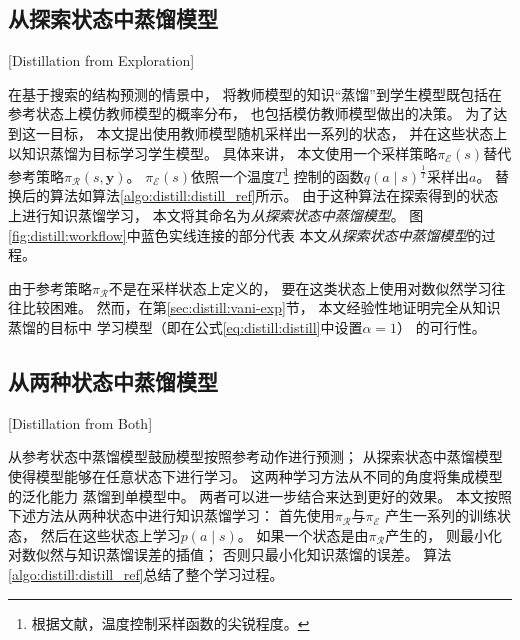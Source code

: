 
\subsection{从探索状态中蒸馏模型}[Distillation from Exploration]\label{sec:distill:distill_explore}

在基于搜索的结构预测的情景中，
将教师模型的知识``蒸馏''到学生模型既包括在参考状态上模仿教师模型的概率分布，
也包括模仿教师模型做出的决策。
为了达到这一目标，
本文提出使用教师模型随机采样出一系列的状态，
并在这些状态上以知识蒸馏为目标学习学生模型。
具体来讲，
本文使用一个采样策略$\pi_\mathcal{E}(s)$替代参考策略$\pi_\mathcal{R}(s, \mathbf{y})$。
$\pi_\mathcal{E}(s)$依照一个温度$T$\footnote{
	根据文献，温度控制采样函数的尖锐程度。}
控制的函数$q(a\mid s)^{\frac{1}{T}}$采样出$a$。
替换后的算法如算法\ref{algo:distill:distill_ref}所示。
由于这种算法在探索得到的状态上进行知识蒸馏学习，
本文将其命名为\textit{从探索状态中蒸馏模型}。
图\ref{fig:distill:workflow}中蓝色实线连接的部分代表
本文\textit{从探索状态中蒸馏模型}的过程。

由于参考策略$\pi_\mathcal{R}$不是在采样状态上定义的，
要在这类状态上使用对数似然学习往往比较困难。
然而，在第\ref{sec:distill:vani-exp}节，
本文经验性地证明完全从知识蒸馏的目标中
学习模型（即在公式\ref{eq:distill:distill}中设置$\alpha = 1$）
的可行性。

\subsection{从两种状态中蒸馏模型}[Distillation from Both]\label{sec:distill_both}

从参考状态中蒸馏模型鼓励模型按照参考动作进行预测；
从探索状态中蒸馏模型使得模型能够在任意状态下进行学习。
这两种学习方法从不同的角度将集成模型的泛化能力
蒸馏到单模型中。
两者可以进一步结合来达到更好的效果。
本文按照下述方法从两种状态中进行知识蒸馏学习：
首先使用$\pi_\mathcal{R}$与$\pi_\mathcal{E}$
产生一系列的训练状态，
然后在这些状态上学习$p(a \mid s)$。
如果一个状态是由$\pi_\mathcal{R}$产生的，
则最小化对数似然与知识蒸馏误差的插值；
否则只最小化知识蒸馏的误差。
算法\ref{algo:distill:distill_ref}总结了整个学习过程。

